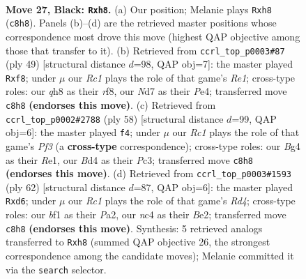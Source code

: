 \documentclass[11pt]{article}
\begin{document}
\clearpage

\begin{figure}[p]\centering
\begin{subfigure}{0.46\textwidth}\centering
\resizebox{\linewidth}{!}{%
\newchessgame
\chessboard[
  setfen={2r4Q/1ppn1pk1/p7/P3P1p1/1PNbP1b1/8/8/R3KB1R b KQ - 0 27},
  showmover=false,
  pgfstyle=straightmove, color=movearrow, markmove={c8-h8}
]}
\caption{}
\end{subfigure}\hfill
\begin{subfigure}{0.46\textwidth}\centering
\resizebox{\linewidth}{!}{%
\newchessgame
\chessboard[
  setfen={4rR2/1b4k1/p2b4/1p6/2Ppp3/P7/BPPB2PP/R5K1 b - - 0 25},
  showmover=false,
  pgfstyle=straightmove, color=movearrow, markmove={e8-f8}
]}
\caption{}
\end{subfigure}
\\[4pt]
\begin{subfigure}{0.46\textwidth}\centering
\resizebox{\linewidth}{!}{%
\newchessgame
\chessboard[
  setfen={2b2k2/2r2ppp/p1n5/1p1p2P1/3N3P/2PB1P2/PP6/1K2R3 w - - 1 30},
  showmover=false,
  pgfstyle=straightmove, color=movearrow, markmove={f3-f4}
]}
\caption{}
\end{subfigure}\hfill
\begin{subfigure}{0.46\textwidth}\centering
\resizebox{\linewidth}{!}{%
\newchessgame
\chessboard[
  setfen={2r3k1/pb3p2/1n1q2p1/7p/2pR4/2N3P1/PPP1B2P/2K5 w - - 0 32},
  showmover=false,
  pgfstyle=straightmove, color=movearrow, markmove={d4-d6}
]}
\caption{}
\end{subfigure}
\caption{\textbf{Move 27, Black: \texttt{Rxh8}.} (a) Our position; Melanie plays \texttt{Rxh8} (\texttt{c8h8}). Panels (b)--(d) are the retrieved master positions whose correspondence most drove this move (highest QAP objective among those that transfer to it). (b) Retrieved from \texttt{ccrl\_top\_p0003\#87} (ply 49) [structural distance $d$=98, QAP obj=7]: the master played \texttt{Rxf8}; under $\mu$ our \emph{Rc1} plays the role of that game's \emph{Re1}; cross-type roles: our \emph{q}h8 as their \emph{r}f8, our \emph{N}d7 as their \emph{P}e4; transferred move \texttt{c8h8} \textbf{(endorses this move)}. (c) Retrieved from \texttt{ccrl\_top\_p0002\#2788} (ply 58) [structural distance $d$=99, QAP obj=6]: the master played \texttt{f4}; under $\mu$ our \emph{Rc1} plays the role of that game's \emph{Pf3} (a \textbf{cross-type} correspondence); cross-type roles: our \emph{B}g4 as their \emph{R}e1, our \emph{B}d4 as their \emph{P}c3; transferred move \texttt{c8h8} \textbf{(endorses this move)}. (d) Retrieved from \texttt{ccrl\_top\_p0003\#1593} (ply 62) [structural distance $d$=87, QAP obj=6]: the master played \texttt{Rxd6}; under $\mu$ our \emph{Rc1} plays the role of that game's \emph{Rd4}; cross-type roles: our \emph{b}f1 as their \emph{P}a2, our \emph{n}c4 as their \emph{B}e2; transferred move \texttt{c8h8} \textbf{(endorses this move)}. Synthesis: 5 retrieved analogs transferred to \texttt{Rxh8} (summed QAP objective 26, the strongest correspondence among the candidate moves); Melanie committed it via the \texttt{search} selector.}
\label{fig:thought-m53}
\end{figure}
\end{document}

